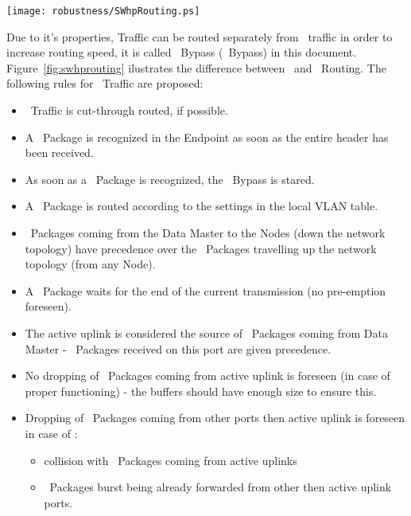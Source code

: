 \begin{center}
	\texttt{[image: robustness/SWhpRouting.ps]}
	\label{fig:swhprouting}
\end{center}

Due to it's properties, \HP Traffic can be routed separately from \SP\ traffic
in order to increase routing speed, it is called \HighPriority\ Bypass (\HP\
Bypass) in this document. Figure~\ref{fig:swhprouting} ilustrates the difference
between
\SP\ and \HP\ Routing. The following rules for \HP\ Traffic are proposed:
\begin{itemize}
  \item \HP\ Traffic is cut-through routed, if possible.
  \item A \HP\ Package is recognized in the Endpoint as soon as the entire
header has been received.
  \item As soon as a \HP\ Package is recognized, the \HP\ Bypass is stared.
  \item A \HP\ Package is routed according to the settings in the local VLAN
table.
  \item \HP\ Packages coming from the Data Master to the Nodes (down the network
topology) have precedence over the \HP\ Packages travelling up the network
topology (from any Node).
  \item A \HP\ Package waits for the end of the current transmission (no
pre-emption foreseen). 
  \item The active uplink is considered the source of \HP\ Packages coming from
Data Master - \HP\ Packages received on this port are given precedence.
  \item No dropping of \HP\ Packages coming from active uplink is foreseen (in
case of proper functioning) - the buffers should have enough size to ensure
this.
  \item Dropping of \HP\ Packages coming from other ports then active
uplink is foreseen in case of :
  \begin{itemize}
    \item collision with \HP\ Packages coming from active uplinks 
    \item \HP\ Packages burst being already forwarded from other then active
uplink ports.
  \end{itemize}

\end{itemize}


